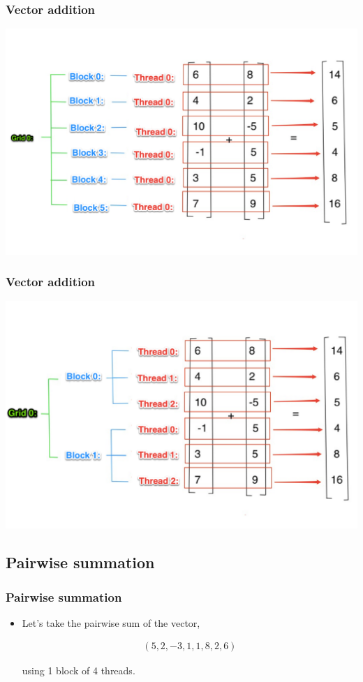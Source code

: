 \documentclass[handout]{beamer}
\numberwithin{equation}{section}
\begin{document}
\begin{frame}
\frametitle{Vector addition}
\begin{center}
\includegraphics[scale=.25]{../../fig/vadd2.pdf}
\end{center}
\end{frame}

\begin{frame}
\frametitle{Vector addition}
\begin{center}
\includegraphics[scale=.25]{../../fig/vadd3.pdf}
\end{center}
\end{frame}

\subsection{Pairwise summation}


\begin{frame}
\frametitle{Pairwise summation}

\begin{itemize}
\item Let's take the pairwise sum of the vector,

\begin{align*}
(5, 2, -3, 1, 1, 8, 2, 6)
\end{align*}

using 1 block of 4 threads.
\end{itemize}
\end{frame}
\end{document}
